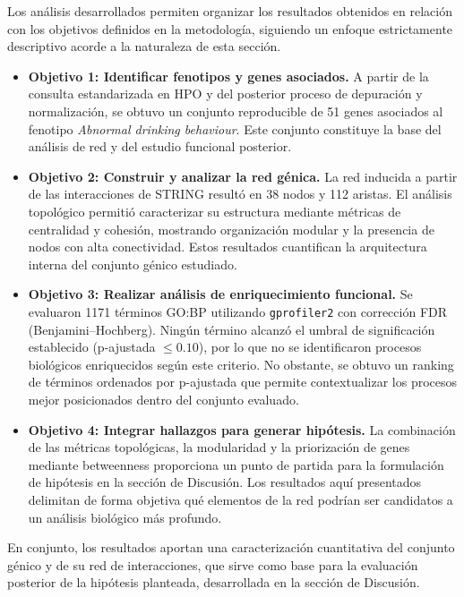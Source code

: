 Los análisis desarrollados permiten organizar los resultados obtenidos en relación
con los objetivos definidos en la metodología, siguiendo un enfoque estrictamente
descriptivo acorde a la naturaleza de esta sección.

\begin{itemize}
    \item \textbf{Objetivo 1: Identificar fenotipos y genes asociados.}  
    A partir de la consulta estandarizada en HPO y del posterior proceso de
    depuración y normalización, se obtuvo un conjunto reproducible de 51 genes
    asociados al fenotipo \textit{Abnormal drinking behaviour}. Este conjunto
    constituye la base del análisis de red y del estudio funcional posterior.

    \item \textbf{Objetivo 2: Construir y analizar la red génica.}  
    La red inducida a partir de las interacciones de STRING resultó en 38 nodos
    y 112 aristas. El análisis topológico permitió caracterizar su estructura
    mediante métricas de centralidad y cohesión, mostrando organización modular
    y la presencia de nodos con alta conectividad. Estos resultados cuantifican
    la arquitectura interna del conjunto génico estudiado.

    \item \textbf{Objetivo 3: Realizar análisis de enriquecimiento funcional.}  
    Se evaluaron 1171 términos GO:BP utilizando \texttt{gprofiler2} con corrección
    FDR (Benjamini--Hochberg). Ningún término alcanzó el umbral de significación
    establecido (p-ajustada $\leq 0.10$), por lo que no se identificaron procesos
    biológicos enriquecidos según este criterio. No obstante, se obtuvo un ranking
    de términos ordenados por p-ajustada que permite contextualizar los procesos
    mejor posicionados dentro del conjunto evaluado.

    \item \textbf{Objetivo 4: Integrar hallazgos para generar hipótesis.}  
    La combinación de las métricas topológicas, la modularidad y la priorización
    de genes mediante betweenness proporciona un punto de partida para la
    formulación de hipótesis en la sección de Discusión. Los resultados aquí
    presentados delimitan de forma objetiva qué elementos de la red podrían ser
    candidatos a un análisis biológico más profundo.
\end{itemize}

En conjunto, los resultados aportan una caracterización cuantitativa del conjunto
génico y de su red de interacciones, que sirve como base para la evaluación
posterior de la hipótesis planteada, desarrollada en la sección de Discusión.
